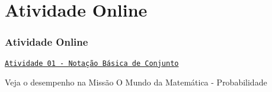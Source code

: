 \section{Atividade Online}


\begin{frame}
\frametitle{Atividade Online} %

\href{https://pt.khanacademy.org/math/statistics-probability/probability-library/basic-set-ops/e/basic_set_notation}
{{\tt Atividade 01 - Notação Básica de Conjunto}}

Veja o desempenho na Missão O Mundo da Matemática - Probabilidade


\end{frame}